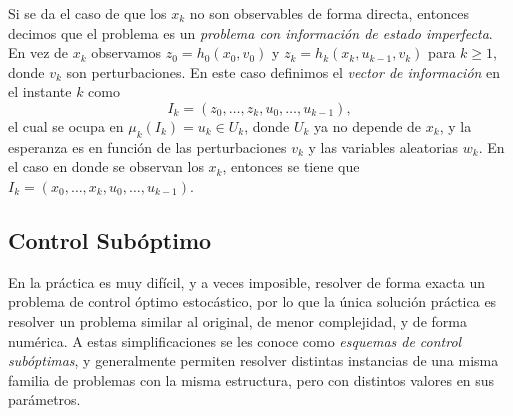 Si se da el caso de que los \(x_k\) no son observables de forma directa, entonces decimos que el problema es un \emph{problema con información de estado imperfecta}. En vez de \(x_{k}\) observamos \(z_{0} = h_{0}(x_{0}, v_{0})\) y \(z_{k} = h_{k}(x_{k}, u_{k-1}, v_{k})\) para \(k\geq 1\), donde \(v_{k}\) son perturbaciones. En este caso definimos el \emph{vector de información} en el instante \(k\) como
\begin{equation*}
	I_{k} = (z_{0}, \dotsc, z_{k}, u_{0}, \dotsc, u_{k-1}),
\end{equation*}
el cual se ocupa en \(\mu_{k}(I_{k}) = u_{k} \in U_{k}\), donde \(U_{k}\) ya no depende de \(x_{k}\), y la esperanza es en función de las perturbaciones \(v_{k}\) y las variables aleatorias \(w_{k}\). En el caso en donde se observan los \(x_{k}\), entonces se tiene que \(I_{k} = (x_{0}, \dotsc, x_{k}, u_{0}, \dotsc, u_{k-1})\).

\subsection{Control Subóptimo}

En la práctica es muy difícil, y a veces imposible, resolver de forma exacta un problema de control óptimo estocástico, por lo que la única solución práctica es resolver un problema similar al original, de menor complejidad, y de forma numérica. A estas simplificaciones se les conoce como \emph{esquemas de control subóptimas}, y generalmente permiten resolver distintas instancias de una misma familia de problemas con la misma estructura, pero con distintos valores en sus parámetros.

